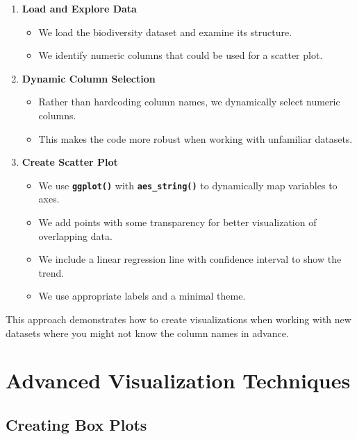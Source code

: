 \documentclass[
  letterpaper,
]{book}
\providecommand{\tightlist}{%
  \setlength{\itemsep}{0pt}\setlength{\parskip}{0pt}}
\begin{document}
\begin{enumerate}
\def\labelenumi{\arabic{enumi}.}
\tightlist
\item
  \textbf{Load and Explore Data}

  \begin{itemize}
  \tightlist
  \item
    We load the biodiversity dataset and examine its structure.
  \item
    We identify numeric columns that could be used for a scatter plot.
  \end{itemize}
\item
  \textbf{Dynamic Column Selection}

  \begin{itemize}
  \tightlist
  \item
    Rather than hardcoding column names, we dynamically select numeric
    columns.
  \item
    This makes the code more robust when working with unfamiliar
    datasets.
  \end{itemize}
\item
  \textbf{Create Scatter Plot}

  \begin{itemize}
  \tightlist
  \item
    We use \textbf{\texttt{ggplot()}} with
    \textbf{\texttt{aes\_string()}} to dynamically map variables to
    axes.
  \item
    We add points with some transparency for better visualization of
    overlapping data.
  \item
    We include a linear regression line with confidence interval to show
    the trend.
  \item
    We use appropriate labels and a minimal theme.
  \end{itemize}
\end{enumerate}

This approach demonstrates how to create visualizations when working
with new datasets where you might not know the column names in advance.

\section{Advanced Visualization
Techniques}\label{advanced-visualization-techniques}

\subsection{Creating Box Plots}\label{creating-box-plots}
\end{document}
